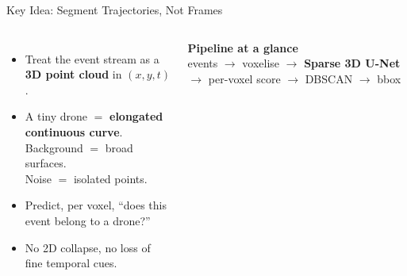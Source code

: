\documentclass[aspectratio=169,11pt]{beamer}
\begin{document}
\begin{frame}{Key Idea: Segment Trajectories, Not Frames}
  \vspace{0.3em}
  \begin{columns}[T,onlytextwidth]
    \begin{itemize}
      \setlength\itemsep{0.5em}
      \item Treat the event stream as a \textbf{3D point cloud} in $(x,y,t)$.
      \item A tiny drone $=$ \textbf{elongated continuous curve}.\\
            Background $=$ broad surfaces.\\
            Noise $=$ isolated points.
      \item Predict, per voxel, ``does this event belong to a drone?''
      \item No 2D collapse, no loss of fine temporal cues.
    \end{itemize}

    \begin{darkbox}
      \centering
      \textbf{Pipeline at a glance}\\[0.4em]
      events
      \;$\to$\; voxelise
      \;$\to$\; \textbf{Sparse 3D U-Net}
      \;$\to$\; per-voxel score
      \;$\to$\; DBSCAN
      \;$\to$\; bbox
    \end{darkbox}
  \end{columns}
\end{frame}
\end{document}
